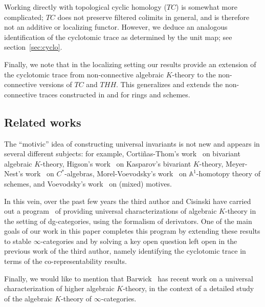 \documentclass{amsart}
\newcommand{\bbA}{\mathbb{A}}
\renewcommand{\i}{\infty}
\numberwithin{equation}{section}
\theoremstyle{definition}
\begin{document}
Working directly with topological cyclic homology ($TC$) is somewhat
more complicated; $TC$ does not preserve filtered colimits in general,
and is therefore not an additive or localizing functor.  However, we
deduce an analogous identification of the cyclotomic trace as
determined by the unit map; see section~\ref{sec:cyclo}.

Finally, we note that in the localizing setting our results provide an
extension of the cyclotomic trace from non-connective algebraic
$K$-theory to the non-connective versions of $TC$ and $THH$.  This
generalizes and extends the non-connective traces constructed
in \cite{GeisserHesselholtRelative} and \cite{BM} for rings and
schemes.

\subsection{Related works}
The ``motivic'' idea of constructing universal invariants is not new
and appears in several different subjects: for example,
Corti{\~n}as-Thom's work~\cite{Cortinas} on bivariant algebraic
$K$-theory, Higson's work~\cite{Higson} on Kasparov's bivariant
$K$-theory, Meyer-Nest's work~\cite{Nest} on $C^{\ast}$-algebras,
Morel-Voevodsky's work~\cite{Morel} on $\bbA^1$-homotopy theory of
schemes, and Voevodsky's work~\cite{Voevodsky} on (mixed) motives.

In this vein, over the past few years the third author and Cisinski
have carried out a program~\cite{CisTab0,CisTab,Duke} of
providing universal characterizations of algebraic $K$-theory in the
setting of dg-categories, using the formalism of derivators.  One of the main goals of our
work in this paper completes this program by extending these results
to stable $\i$-categories and by solving a key open question left open
in the previous work of the third author, namely identifying the
cyclotomic trace in terms of the co-representability results.

Finally, we would like to mention that Barwick~\cite{Bar} has recent work on a
universal characterization of higher algebraic $K$-theory, in the
context of a detailed study of the algebraic $K$-theory of
$\i$-categories. 

\bigskip
\end{document}

